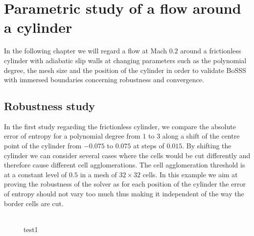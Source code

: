\chapter{Parametric study of a flow around a cylinder}
	In the following chapter we will regard a flow at Mach $0.2$ around a frictionless cylinder with adiabatic slip walls at changing parameters such as the polynomial degree, the mesh size and the position of the cylinder in order to validate BoSSS with immersed boundaries concerning robustness and convergence.

	\section{Robustness study}
	In the first study regarding the frictionless cylinder, we compare the absolute error of entropy for a polynomial degree from $1$ to $3$ along a shift of the centre point of the cylinder from $-0.075$ to $0.075$ at steps of $0.015$. By shifting the cylinder we can consider several cases where the cells would be cut differently and therefore cause different cell agglomerations. The cell agglomeration threshold is at a constant level of $0.5$ in a mesh of $32 \times 32$ cells. In this example we aim at proving the robustness of the solver as for each position of the cylinder the error of entropy should not vary too much thus making it independent of the way the border cells are cut. \\ \\

	\begin{figure}[htp]	
		\centering
		\label{shifterror}	
		\caption{test1}
	\end{figure}
	

